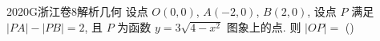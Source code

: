 
\begin{problem}{2020}{G}{浙江卷}{8}{解析几何}
设点 $ O(0,0) $, $ A(-2,0) $, $ B(2,0) $, 设点 $ P $ 满足 $ |PA|-|PB|=2 $, 且 $ P $ 为函数 $ y=3\sqrt{4-x^2} $ 图象上的点. 则 $ |OP|= $ (\hspace{1cm})

\begin{choices}
\end{choices}
\end{problem}

\begin{answer}

\end{answer}

\begin{solutions}

\end{solutions}